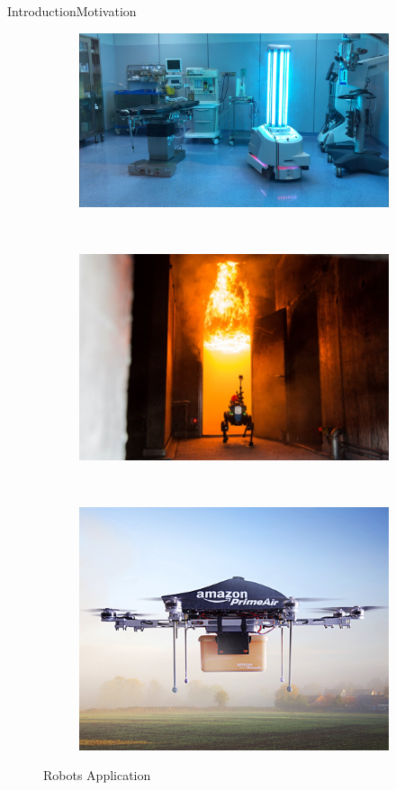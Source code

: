 \documentclass{beamer}
\begin{document}
\begin{frame}{Introduction}{Motivation}


\begin{figure}
    \begin{subfigure}[b]{0.3\textwidth}
        \includegraphics[width=\textwidth,height=2.2 cm]{figs/img/covid.jpg}
      
    \end{subfigure}
    ~ %
    \begin{subfigure}[b]{0.3\textwidth}
        \includegraphics[width=\textwidth]{figs/img/searchRescue.png}
     
    \end{subfigure}
    ~ %
    \begin{subfigure}[b]{0.3\textwidth}
        \includegraphics[width=\textwidth,height = 2.2 cm]{figs/img/amazon.jpg}
    
    \end{subfigure}
    \caption{Robots Application}\label{fig:applications}
\end{figure}




\end{frame}
\end{document}

